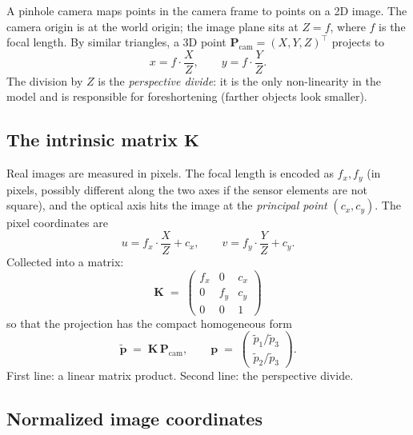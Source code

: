 \documentclass[11pt]{article}
\newcommand{\Pcam}{\mathbf{P}_{\text{cam}}}
\newcommand{\KK}{\mathbf{K}}
\begin{document}
A pinhole camera maps points in the camera frame to points on a 2D image.
The camera origin is at the world origin; the image plane sits at $Z = f$,
where $f$ is the focal length. By similar triangles, a 3D point
$\Pcam = (X, Y, Z)^\top$ projects to
\begin{equation}
  x = f\cdot\frac{X}{Z}, \qquad y = f\cdot\frac{Y}{Z}.
  \label{eq:similar-triangles}
\end{equation}
The division by $Z$ is the \emph{perspective divide}: it is the only
non-linearity in the model and is responsible for foreshortening (farther
objects look smaller).

\subsection{The intrinsic matrix \texorpdfstring{$\KK$}{K}}

Real images are measured in pixels. The focal length is encoded as
$f_x, f_y$ (in pixels, possibly different along the two axes if the sensor
elements are not square), and the optical axis hits the image at the
\emph{principal point} $(c_x, c_y)$. The pixel coordinates are
\begin{equation}
  u = f_x \cdot \frac{X}{Z} + c_x, \qquad
  v = f_y \cdot \frac{Y}{Z} + c_y.
  \label{eq:pixel-projection}
\end{equation}
Collected into a matrix:
\begin{equation}
  \boxed{\quad
    \KK \;=\; \begin{pmatrix} f_x & 0 & c_x \\ 0 & f_y & c_y \\ 0 & 0 & 1 \end{pmatrix}
  \quad}
\end{equation}
so that the projection has the compact homogeneous form
\begin{equation}
  \tilde{\mathbf{p}} \;=\; \KK\,\Pcam,
  \qquad
  \mathbf{p} \;=\; \begin{pmatrix} \tilde p_1/\tilde p_3 \\ \tilde p_2/\tilde p_3 \end{pmatrix}.
\end{equation}
First line: a linear matrix product. Second line: the perspective divide.

\subsection{Normalized image coordinates}
\end{document}
